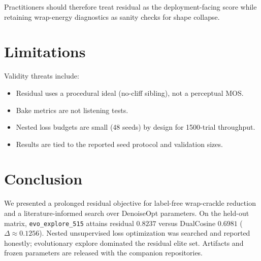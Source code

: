 \documentclass[11pt,a4paper]{article}
\begin{document}
Practitioners should therefore treat residual as the deployment-facing score while retaining wrap-energy diagnostics as sanity checks for shape collapse.

\section{Limitations}
Validity threats include:
\begin{itemize}
  \item Residual uses a procedural ideal (no-cliff sibling), not a perceptual MOS.
  \item Bake metrics are not listening tests.
  \item Nested loss budgets are small (48 seeds) by design for 1500-trial throughput.
  \item Results are tied to the reported seed protocol and validation sizes.
\end{itemize}

\section{Conclusion}
We presented a prolonged residual objective for label-free wrap-crackle reduction and a literature-informed search over DenoiseOpt parameters. On the held-out matrix, \texttt{evo\_explore\_515} attains residual $0.8237$ versus DualCosine $0.6981$ ($\Delta\approx 0.1256$). Nested unsupervised loss optimization was searched and reported honestly; evolutionary explore dominated the residual elite set. Artifacts and frozen parameters are released with the companion repositories.
\end{document}
